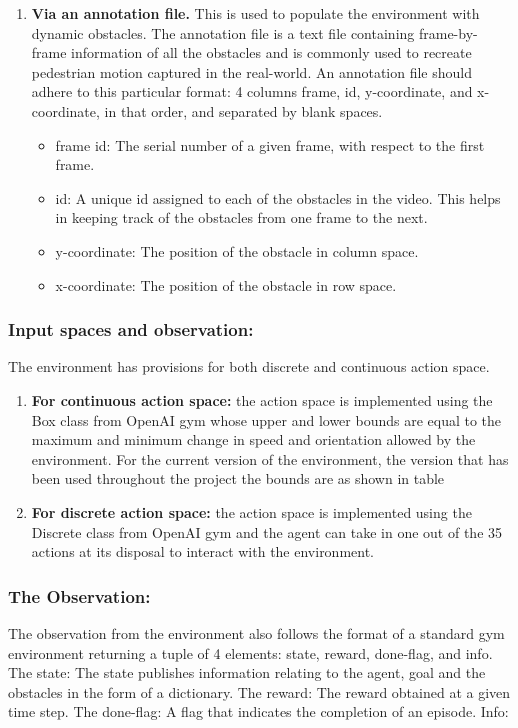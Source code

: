 \begin{enumerate}
\item \textbf{Via an annotation file.}
This is used to populate the environment with dynamic obstacles. The annotation file is a text file containing frame-by-frame information of all the obstacles and is commonly used to recreate pedestrian motion captured in the real-world. An annotation file should adhere to this particular format: 4 columns frame, id, y-coordinate, and x-coordinate, in that order, and separated by blank spaces.
\begin{itemize}
	\item frame id: The serial number of a given frame, with respect to the first frame.
	\item id: A unique id assigned to each of the obstacles in the video. This helps in keeping track of the obstacles from one frame to the next.
	\item y-coordinate: The position of the obstacle in column space.
	\item x-coordinate: The position of the obstacle in row space.
\end{itemize}
\end{enumerate}
\subsubsection*{Input spaces and observation:}
The environment has provisions for both discrete and continuous action space.
\begin{enumerate}
	\item \textbf{For continuous action space:} the action space is implemented using the Box class from OpenAI gym whose upper and lower bounds are equal to the maximum and minimum change in speed and orientation allowed by the environment. For the current version of the environment, the version that has been used throughout the project the bounds are as shown in table 
	\item \textbf{For discrete action space:} the action space is implemented using the Discrete class from OpenAI gym and the agent can take in one out of the 35 actions at its disposal to interact with the environment.
\end{enumerate}
\subsubsection*{The Observation:}
The observation from the environment also follows the format of a standard gym environment returning a tuple of 4 elements: state, reward, done-flag, and info.
The state:
The state publishes information relating to the agent, goal and the obstacles in the form of a dictionary.
The reward:
The reward obtained at a given time step.
The done-flag:
A flag that indicates the completion of an episode.
Info:

